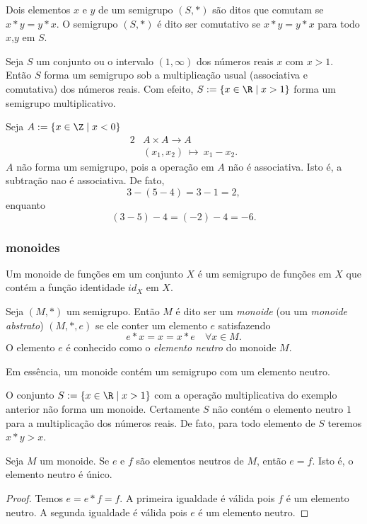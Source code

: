       \begin{definition}[Comutatividade]
         Dois elementos $x$ e $y$ de um semigrupo $(S, *)$ são ditos que comutam se $x* y = y* x$. O semigrupo $(S, *)$ é dito ser comutativo se $x* y = y * x$ para todo $x$,$y$ em $S$.
      \end{definition}
      \begin{exmp}
         Seja $S$ um conjunto ou o intervalo $(1,\infty)$ dos números reais $x$ com $x > 1$. Então $S$ forma um semigrupo sob a multiplicação usual (associativa e comutativa) dos números reais.
         Com efeito, $S := \{x \in \R \mid x > 1\}$ forma um semigrupo multiplicativo.
      \end{exmp}
      \begin{exmp}
         Seja $A:= \{x \in \Z \mid x < 0\}$
         \begin{alignat}{2}
            &A \times A \to A \nonumber\\
            &\left(x_{1},x_{2}\right)\ \mapsto\ x_{1} - x_{2}.
            \nonumber
         \end{alignat}
         $A$ não forma um semigrupo, pois a operação em $A$ não é associativa. Isto é, a subtração nao é associativa. De fato, $$3-(5-4)=3-1=2,$$ enquanto $$(3-5)-4=(-2)-4=-6.$$
      \end{exmp}

      \subsubsection{monoides}
         Um monoide de funções em um conjunto $X$ é um semigrupo de funções em $X$ que contém a função identidade $id_{X}$ em $X$.
         \begin{definition}
            Seja $(M, *)$ um semigrupo. Então $M$ é dito ser um \emph{monoide} (ou um \emph{monoide abstrato}) $(M, *, e)$ se ele conter um elemento $e$ satisfazendo $$e * x = x = x * e\quad \forall x \in M.$$ O elemento $e$ é conhecido como o \textit{elemento neutro} do monoide $M$.
         \end{definition}
         Em essência, um monoide contém um semigrupo com um elemento neutro.
         \begin{exmp}
            O conjunto $S := \{x \in \R \mid x > 1\}$ com a operação multiplicativa do exemplo anterior não forma um monoide. Certamente $S$ não contém o elemento neutro $1$ para a multiplicação dos números reais. De fato, para todo elemento de $S$ teremos $x * y > x$.
         \end{exmp}
         \begin{stat}
            Seja $M$ um monoide. Se $e$ e $f$ são elementos neutros de $M$, então $e=f$. Isto é, o elemento neutro é único.
            \begin{proof}
               Temos $e = e * f = f$. A primeira igualdade é válida pois $f$ é um elemento neutro. A segunda igualdade é válida pois $e$ é um elemento neutro.
            \end{proof}
         \end{stat}

